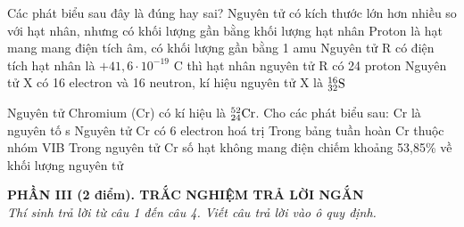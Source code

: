 \documentclass[11pt,a4paper]{article}
\begin{document}
\begin{ex}
Các phát biểu sau đây là đúng hay sai?
\choiceTF
{\True Nguyên tử có kích thước lớn hơn nhiều so với hạt nhân, nhưng có khối lượng gần bằng khối lượng hạt nhân}
{Proton là hạt mang mang điện tích âm, có khối lượng gần bằng 1 amu}
{Nguyên tử R có điện tích hạt nhân là $+41,6\cdot 10^{-19}\text{ C}$ thì hạt nhân nguyên tử R có 24 proton}
{Nguyên tử X có 16 electron và 16 neutron, kí hiệu nguyên tử X là $^{16}_{32}\ce{S}$}

\end{ex}
\begin{ex}
Nguyên tử Chromium (Cr) có kí hiệu là $^{52}_{24}\ce{Cr}$. Cho các phát biểu sau:
\choiceTF
{Cr là nguyên tố s}
{\True Nguyên tử Cr có 6 electron hoá trị}
{\True Trong bảng tuần hoàn Cr thuộc nhóm VIB}
{\True Trong nguyên tử Cr số hạt không mang điện chiếm khoảng 53,85\% về khối lượng nguyên tử}

\end{ex}
\vspace{4pt}
\noindent
{\color{mainGreen}\textbf{\large PHẦN III (2 điểm). TRẮC NGHIỆM TRẢ LỜI NGẮN}}\\
\textit{\small Thí sinh trả lời từ câu 1 đến câu 4. Viết câu trả lời vào ô quy định.}
\vspace{2pt}
\end{document}
